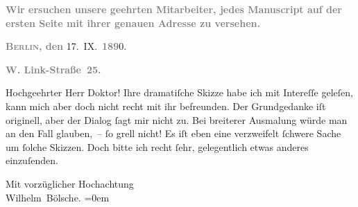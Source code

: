 \pstart
           \textcolor{gray}{\textbf{Wir ersuchen unsere geehrten Mitarbeiter, jedes Manuscript
                     auf der ersten Seite mit ihrer genauen Adresse zu versehen.}}\pend
           
\pstart
           \raggedleft{}\textcolor{gray}{\textbf{\textsc{Berlin}, den}}{ }17. IX. \textcolor{gray}{\textbf{189}}0.\pend
           
\pstart
           \raggedleft{}\textcolor{gray}{\textbf{W. Link-Straße 25.}}\pend
           
\pstart\center{}Hochgeehrter Herr Doktor!\pend\vspace{0.5em}
\pstart
           Ihre dramatiſche Skizze habe
               ich mit Intereſſe geleſen, kann mich aber doch nicht recht mit ihr befreunden. Der
               Grundgedanke iſt originell, aber der Dialog{ }ſagt mir nicht zu. Bei breiterer
               Ausmalung würde man an den Fall glauben, –{ }ſo grell nicht! Es iſt eben eine
               verzweifelt{ }ſchwere Sache um{ }ſolche Skizzen. Doch bitte ich recht{ }ſehr, gelegentlich
               etwas anderes einzuſenden.\pend
           
\pstart
           Mit vorzüglicher Hochachtung{\\[\baselineskip]}\spacefill\mbox{Wilhelm Bölsche.}\pend
           \leftskip=0em{}\endnumbering{}  \newcommand{\dateiname}{L00004}\newcommand{\titel}{Wilhelm Bölsche an Arthur Schnitzler, 17. 9. 1890}\newcommand{\editorInnen}{Martin Anton Müller und Gerd-Hermann Susen}
